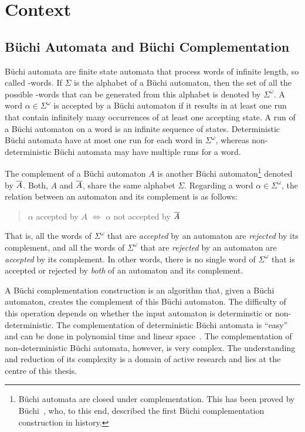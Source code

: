 \section{Context}
\label{1_context}

\subsection{Büchi Automata and Büchi Complementation}

Büchi automata are finite state automata that process words of infinite length, so called \om-words. If $\Sigma$ is the alphabet of a Büchi automaton, then the set of all the possible \om-words that can be generated from this alphabet is denoted by $\Sigma^\omega$. A word $\alpha \in \Sigma^\omega$ is accepted by a Büchi automaton if it results in at least one run that contain infinitely many occurrences of at least one accepting state. A run of a Büchi automaton on a word is an infinite sequence of states. Deterministic Büchi automata have at most one run for each word in $\Sigma^\omega$, whereas non-deterministic Büchi automata may have multiple runs for a word.

The complement of a Büchi automaton $A$ is another Büchi automaton\footnote{Büchi automata are closed under complementation. This has been proved by Büchi~\cite{buchi1960decision}, who, to this end, described the first Büchi complementation construction in history.} denoted by $\cl1{A}$. Both, $A$ and $\cl1{A}$, share the same alphabet $\Sigma$. Regarding a word $\alpha \in \Sigma^\omega$, the relation between an automaton and its complement is as follows:

\begin{quote}
\centering
$\alpha$ accepted by $A$ $\Longleftrightarrow$ $\alpha$ not accepted by $\cl1{A}$
\end{quote}

That is, all the words of $\Sigma^\omega$ that are \textit{accepted} by an automaton are \textit{rejected} by its complement, and all the words of $\Sigma^\omega$ that are \textit{rejected} by an automaton are \textit{accepted} by its complement. In other words, there is no single word of $\Sigma^\omega$ that is  accepted or rejected by \textit{both} of an automaton and its complement.

A Büchi complementation construction is an algorithm that, given a Büchi automaton, creates the complement of this Büchi automaton. The difficulty of this operation depends on whether the input automaton is determinstic or non-deterministic. The complementation of deterministic Büchi automata is ``easy'' and can be done in polynomial time and linear space~\cite{Kurshan198759}. The complementation of non-deterministic Büchi automata, however, is very complex. The understanding and reduction of its complexity is a domain of active research and lies at the centre of this thesis.

